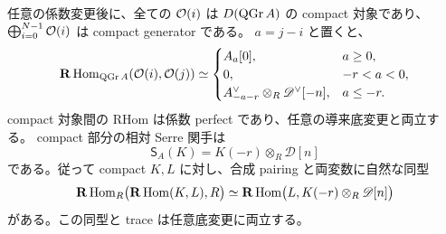 \begin{theorem}
\label{mbsd:thm:serre}
任意の係数変更後に、全ての $\mathcal O(i)$ は $D(\operatorname{QGr} A)$ の compact 対象であり、
$\bigoplus_{i=0}^{N-1}\mathcal O(i)$ は compact generator である。
$a=j-i$ と置くと、
\begin{equation}\label{mbsd:eq:line-cohomology}
 \mathbf R\operatorname{Hom}_{\operatorname{QGr} A}(\mathcal O(i),\mathcal O(j))\simeq
 \begin{cases}
 A_a[0],&a\geq0,\\
 0,&-r<a<0,\\
 A_{-a-r}^\vee\otimes_R\mathscr D^\vee[-n],&a\leq-r.
 \end{cases}
\end{equation}
compact 対象間の RHom は係数 perfect であり、任意の導来底変更と両立する。
compact 部分の相対 Serre 関手は
\begin{equation}\label{mbsd:eq:serre}
 \mathsf S_A(K)=K(-r)\otimes_R\mathscr D[n]
\end{equation}
である。従って compact $K,L$ に対し、合成 pairing と両変数に自然な同型
\[
 \mathbf R\operatorname{Hom}_R\bigl(\mathbf R\operatorname{Hom}(K,L),R\bigr)
 \simeq\mathbf R\operatorname{Hom}\bigl(L,K(-r)\otimes_R\mathscr D[n]\bigr)
\]
がある。この同型と trace は任意底変更に両立する。
\end{theorem}
